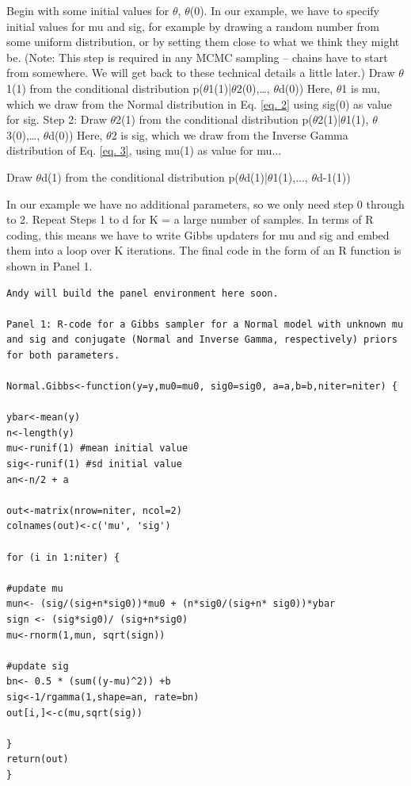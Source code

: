 { Begin with some initial values for $\theta$, $\theta$(0).   }
In our example, we have to specify initial values for mu and sig, for
example by drawing a random number from some uniform distribution, or
by setting them close to what we think they might be. (Note: This step
is required in any MCMC sampling – chains have to start from
somewhere. We will get back to these technical details a little
later.)
{ Draw $\theta$1(1) from the conditional distribution p($\theta$1(1)|$\theta$2(0),…, $\theta$d(0)) }
Here, $\theta$1 is mu, which we draw from the Normal distribution in Eq. \ref{eq. 2}  using sig(0) as value for sig.
{\flushleft Step 2: Draw $\theta$2(1) from the conditional distribution p($\theta$2(1)|$\theta$1(1), $\theta$3(0),…, $\theta$d(0)) }
Here, $\theta$2 is sig, which we draw from the Inverse Gamma
distribution of Eq. \ref{eq. 3}, using mu(1) as value for mu...

{ Draw $\theta$d(1) from the conditional distribution p($\theta$d(1)|$\theta$1(1),..., $\theta$d-1(1)) }

In our example we have no additional parameters, so we only need step 0 through to 2.
Repeat Steps 1 to d for K = a large number of samples.
In terms of R coding, this means we have to write Gibbs updaters for
mu and sig and embed them into a loop over K iterations. The final
code in the form of an R function is shown in Panel 1.

\begin{verbatim}
Andy will build the panel environment here soon.

Panel 1: R-code for a Gibbs sampler for a Normal model with unknown mu
and sig and conjugate (Normal and Inverse Gamma, respectively) priors
for both parameters.

Normal.Gibbs<-function(y=y,mu0=mu0, sig0=sig0, a=a,b=b,niter=niter) {

ybar<-mean(y)
n<-length(y)
mu<-runif(1) #mean initial value
sig<-runif(1) #sd initial value
an<-n/2 + a

out<-matrix(nrow=niter, ncol=2)
colnames(out)<-c('mu', 'sig')

for (i in 1:niter) {

#update mu
mun<- (sig/(sig+n*sig0))*mu0 + (n*sig0/(sig+n* sig0))*ybar
sign <- (sig*sig0)/ (sig+n*sig0)
mu<-rnorm(1,mun, sqrt(sign))

#update sig
bn<- 0.5 * (sum((y-mu)^2)) +b
sig<-1/rgamma(1,shape=an, rate=bn)
out[i,]<-c(mu,sqrt(sig))

}
return(out)
}
\end{verbatim}

